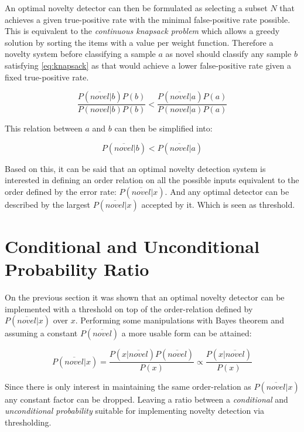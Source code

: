 An optimal novelty detector can then be formulated as selecting a subset $N$
that achieves a given true-positive rate with the minimal false-positive
rate possible. This is equivalent to the \emph{continuous knapsack problem}
which allows a greedy solution by sorting the items with a value per weight
function.
Therefore a novelty system before classifying a sample $a$ as novel should
classify any sample $b$ satisfying \autoref{eq:knapsack} as that would achieve
a lower false-positive rate given a fixed true-positive rate.

\begin{equation}
\label{eq:knapsack}
\frac{P(\overline{novel}|b)P(b)}{P(novel|b)P(b)} < \frac{P(\overline{novel}|a)P(a)}{P(novel|a)P(a)}
\end{equation}

This relation between $a$ and $b$ can then be simplified into:

\begin{equation}
P(\overline{novel}|b) < P(\overline{novel}|a)
\end{equation}


Based on this, it can be said that an optimal novelty detection system is
interested in defining an order relation on all the possible inputs equivalent
to the order defined by the error rate: $P(\overline{novel}|x)$.
And any optimal detector can be described by the largest $P(\overline{novel}|x)$
accepted by it. Which is seen as threshold.


\section{Conditional and Unconditional Probability Ratio}

On the previous section it was shown that an optimal novelty detector can be
implemented with a threshold on top of the order-relation defined by
$P(\overline{novel}|x)$ over $x$. Performing some manipulations with
Bayes theorem and assuming a constant $P(\overline{novel})$ a more usable
form can be attained:

\begin{equation}
\label{eq:novelty-ratio}
          P(\overline{novel}|x)
  =       \frac{P(x|\overline{novel}) P(\overline{novel})}{P(x)}
  \propto \frac{P(x|\overline{novel})}{P(x)}
\end{equation}

Since there is only interest in maintaining the same order-relation as
$P(\overline{novel}|x)$ any constant factor can be dropped.
Leaving a ratio between a \emph{conditional} and
\emph{unconditional probability} suitable for implementing novelty detection
via thresholding.


